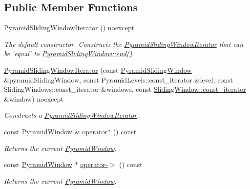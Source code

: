 \subsection*{Public Member Functions}
\begin{DoxyCompactItemize}
\item 
\hyperlink{group___imagery_module_gacbd11cb149d2263770674f86d6595617}{Pyramid\+Sliding\+Window\+Iterator} () noexcept
\begin{DoxyCompactList}\small\item\em The default constructor. Constructs the \hyperlink{classdg_1_1deepcore_1_1imagery_1_1_pyramid_sliding_window_iterator}{Pyramid\+Sliding\+Window\+Iterator} that can be \char`\"{}equal\char`\"{} to \hyperlink{group___imagery_module_gaf39101c886a6ca5194201848f7d6d831}{Pyramid\+Sliding\+Window\+::end()}. \end{DoxyCompactList}\item 
\hyperlink{group___imagery_module_gaba595bfc1790d917eaa28c1533afa2ad}{Pyramid\+Sliding\+Window\+Iterator} (const \hyperlink{classdg_1_1deepcore_1_1imagery_1_1_pyramid_sliding_window}{Pyramid\+Sliding\+Window} \&pyramid\+Sliding\+Window, const Pyramid\+Levels\+::const\+\_\+iterator \&level, const Sliding\+Windows\+::const\+\_\+iterator \&windows, const \hyperlink{classdg_1_1deepcore_1_1imagery_1_1_sliding_window_aca1804ceef890966623a8acfcd01f2e9}{Sliding\+Window\+::const\+\_\+iterator} \&window) noexcept
\begin{DoxyCompactList}\small\item\em Constructs a \hyperlink{classdg_1_1deepcore_1_1imagery_1_1_pyramid_sliding_window_iterator}{Pyramid\+Sliding\+Window\+Iterator}. \end{DoxyCompactList}\item 
const \hyperlink{structdg_1_1deepcore_1_1imagery_1_1_pyramid_window}{Pyramid\+Window} \& \hyperlink{group___imagery_module_gaca9c2f2b709dbe324355c544933339ee}{operator$\ast$} () const 
\begin{DoxyCompactList}\small\item\em Returns the current \hyperlink{structdg_1_1deepcore_1_1imagery_1_1_pyramid_window}{Pyramid\+Window}. \end{DoxyCompactList}\item 
const \hyperlink{structdg_1_1deepcore_1_1imagery_1_1_pyramid_window}{Pyramid\+Window} $\ast$ \hyperlink{group___imagery_module_gac54e72b4aa8c5b92bc491c12aed242d0}{operator-\/$>$} () const 
\begin{DoxyCompactList}\small\item\em Returns the current \hyperlink{structdg_1_1deepcore_1_1imagery_1_1_pyramid_window}{Pyramid\+Window}. \end{DoxyCompactList}\item 

\end{DoxyCompactItemize}
